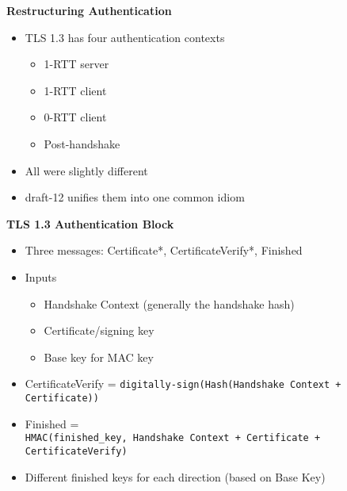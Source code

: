 \documentclass[helvetica]{seminar}
\newcommand{\heading}[1]{%
  \begin{center} 
    \large\bf 
    #1 
  \end{center} 
  \vspace{.4 in}}
\begin{document}
\begin{slide}
\heading{Restructuring Authentication}

\begin{itemize}
\item TLS 1.3 has four authentication contexts
  \begin{itemize}
  \item 1-RTT server
  \item 1-RTT client
  \item 0-RTT client
  \item Post-handshake
  \end{itemize}

\item All were slightly different
\item draft-12 unifies them into one common idiom
\end{itemize}
\end{slide}


\begin{slide}
\heading{TLS 1.3 Authentication Block}

\begin{itemize}
\item Three messages: Certificate*, CertificateVerify*, Finished
\item Inputs
  \begin{itemize}
  \item Handshake Context (generally the handshake hash)
  \item Certificate/signing key
  \item Base key for MAC key
  \end{itemize}

\item CertificateVerify = {\small \verb^digitally-sign(Hash(Handshake Context + Certificate))^}
\item Finished = \\
  {\small \verb^HMAC(finished_key, Handshake Context + Certificate + CertificateVerify)^}
\item Different finished keys for each direction (based on Base Key)
\end{itemize}
\end{slide}
\end{document}
